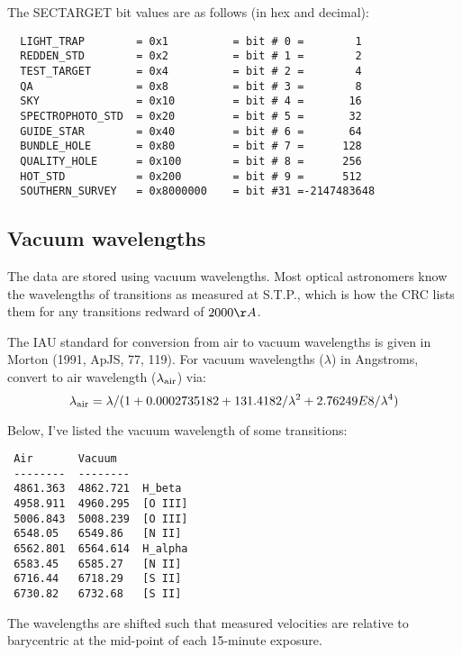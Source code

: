 \documentclass[12pt,preprint]{aastex}
\begin{document}
The SECTARGET bit values are as follows (in hex and decimal):
\begin{verbatim}
  LIGHT_TRAP        = 0x1          = bit # 0 =        1
  REDDEN_STD        = 0x2          = bit # 1 =        2
  TEST_TARGET       = 0x4          = bit # 2 =        4
  QA                = 0x8          = bit # 3 =        8
  SKY               = 0x10         = bit # 4 =       16
  SPECTROPHOTO_STD  = 0x20         = bit # 5 =       32
  GUIDE_STAR        = 0x40         = bit # 6 =       64
  BUNDLE_HOLE       = 0x80         = bit # 7 =      128
  QUALITY_HOLE      = 0x100        = bit # 8 =      256
  HOT_STD           = 0x200        = bit # 9 =      512
  SOUTHERN_SURVEY   = 0x8000000    = bit #31 =-2147483648
\end{verbatim}

\subsection{Vacuum wavelengths}

The data are stored using vacuum wavelengths.
Most optical astronomers know the wavelengths of transitions
as measured at S.T.P., which is how the CRC lists them for any
transitions redward of $2000\AA$.

The IAU standard for conversion from air to vacuum wavelengths
is given in Morton (1991, ApJS, 77, 119). For vacuum wavelengths ($\lambda$)
in Angstroms, convert to air wavelength ($\lambda_{\rm air}$) via:
$$\lambda_{\rm air} = \lambda / (1 + 0.0002735182 + 131.4182 / \lambda^2 + 2.76249E8 / \lambda^4) $$

Below, I've listed the vacuum wavelength of some transitions:
\begin{verbatim}
 Air       Vacuum
 --------  --------
 4861.363  4862.721  H_beta
 4958.911  4960.295  [O III]
 5006.843  5008.239  [O III]
 6548.05   6549.86   [N II]
 6562.801  6564.614  H_alpha
 6583.45   6585.27   [N II]
 6716.44   6718.29   [S II]
 6730.82   6732.68   [S II]
\end{verbatim}
The wavelengths are shifted such that measured velocities are relative
to barycentric at the mid-point of each 15-minute exposure.


\begin{figure}[tb]
\end{figure}
\end{document}
